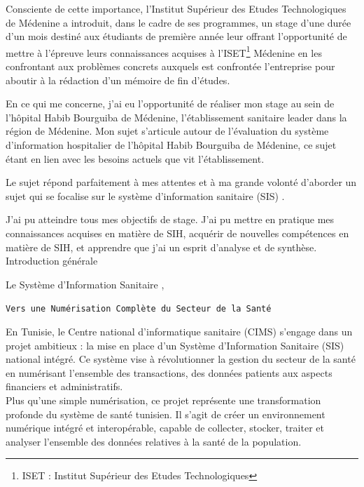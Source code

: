 \documentclass[12pt]{rapportINPTCLOUD}
\begin{document}
	Consciente de cette importance, l’Institut Supérieur des Etudes Technologiques de Médenine a introduit, dans le cadre de ses programmes, un stage d’une durée d’un mois destiné aux étudiants de première année leur offrant l’opportunité de mettre à l’épreuve leurs connaissances acquises à l’ISET\footnote{ISET : Institut Supérieur des Etudes Technologiques} Médenine en les confrontant aux problèmes concrets auxquels est confrontée l’entreprise pour aboutir à la rédaction d’un mémoire de fin d’études.
	
	En ce qui me concerne, j’ai eu l’opportunité de réaliser mon stage au sein de l’hôpital Habib Bourguiba de Médenine, l’établissement sanitaire leader dans la région de Médenine.
	Mon sujet s’articule autour de l’évaluation du système d’information hospitalier de l’hôpital Habib Bourguiba de Médenine, ce sujet étant en lien avec les besoins actuels que vit l’établissement.
	
	Le sujet répond parfaitement à mes attentes et à ma grande volonté d’aborder un sujet qui se focalise sur le système d’information sanitaire (SIS) . 
	
	J’ai pu atteindre tous mes objectifs de stage. J’ai pu mettre en pratique mes connaissances acquises en matière de SIH, acquérir de nouvelles compétences en matière de SIH, et apprendre que j’ai un esprit d’analyse et de synthèse.
	\newpage
	\setcounter{page}{1}
{\Huge Introduction générale}
	\begin{center}

		Le Système d'Information Sanitaire ,
	\end{center}
	\begin{center}
		\texttt{Vers une Numérisation Complète du Secteur de la Santé}
	\end{center} 
	
	En Tunisie, le Centre national d'informatique sanitaire (CIMS) s'engage dans un projet ambitieux : la mise en place d'un Système d'Information Sanitaire (SIS) national intégré. Ce système vise à révolutionner la gestion du secteur de la santé en numérisant l'ensemble des transactions, des données patients aux aspects financiers et administratifs.\\
	
	Plus qu'une simple numérisation, ce projet représente une transformation profonde du système de santé tunisien. Il s'agit de créer un environnement numérique intégré et interopérable, capable de collecter, stocker, traiter et analyser l'ensemble des données relatives à la santé de la population.\\
	
\end{document}
